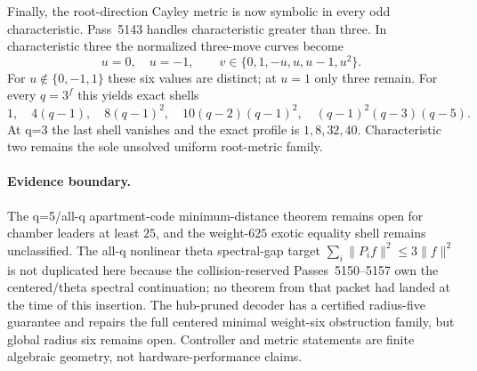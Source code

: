 Finally, the root-direction Cayley metric is now symbolic in every odd characteristic.  Pass~5143 handles characteristic greater than three.  In characteristic three the normalized three-move curves become
\[
 u=0,\quad u=-1,\qquad
 v\in\{0,1,-u,u,u-1,u^2\}.
\]
For $u\notin\{0,-1,1\}$ these six values are distinct; at $u=1$ only three remain.  For every $q=3^f$ this yields exact shells
\[
 \boxed{1,\quad4(q-1),\quad8(q-1)^2,\quad
 10(q-2)(q-1)^2,\quad(q-1)^2(q-3)(q-5)}.
\]
At q=3 the last shell vanishes and the exact profile is $1,8,32,40$.  Characteristic two remains the sole unsolved uniform root-metric family.

\paragraph{Evidence boundary.}
The q=5/all-q apartment-code minimum-distance theorem remains open for chamber leaders at least $25$, and the weight-$625$ exotic equality shell remains unclassified.  The all-q nonlinear theta spectral-gap target $\sum_i\|P_i f\|^2\le3\|f\|^2$ is not duplicated here because the collision-reserved Passes~5150--5157 own the centered/theta spectral continuation; no theorem from that packet had landed at the time of this insertion.  The hub-pruned decoder has a certified radius-five guarantee and repairs the full centered minimal weight-six obstruction family, but global radius six remains open.  Controller and metric statements are finite algebraic geometry, not hardware-performance claims.
\fi

